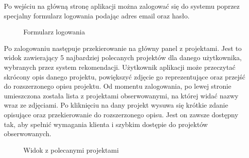 Po wejściu na główną stronę aplikacji można zalogować się do systemu poprzez specjalny formularz logowania podając adres email oraz hasło. 



\begin{figure}[h!]
	\caption{Formularz logowania}
	\centering
\end{figure}


Po zalogowaniu następuje przekierowanie na główny panel z projektami. Jest to widok zawierający 5 najbardziej polecanych projektów dla danego użytkownika, wybranych przez system rekomendacji. Użytkownik aplikacji może przeczytać skrócony opis danego projektu, powiększyć zdjęcie go reprezentujące oraz przejść do rozszerzonego opisu projektu. Od momentu zalogowania, po lewej stronie umieszczona została lista z projektami obserwowanymi, na której widać nazwy wraz ze zdjęciami. Po kliknięciu na dany projekt wysuwa się krótkie zdanie opisujące oraz przekierowanie do rozszerzonego opisu. Jest on zawsze dostępny tak, aby spełnić wymagania klienta i szybkim dostępie do projektów obserwowanych.

\begin{figure}[h!]
	\caption{Widok z polecanymi projektami}
	\centering
\end{figure}

